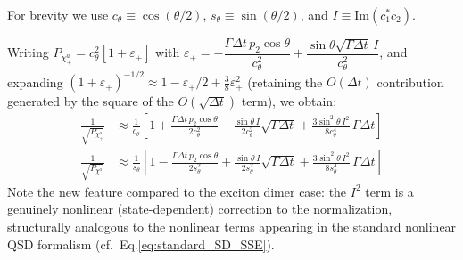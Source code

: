 \documentclass[a4paper,12pt]{article}
\begin{document}
For brevity we use $c_{\theta}\equiv\cos(\theta/2)$, $s_{\theta}\equiv\sin(\theta/2)$, and $I \equiv \text{Im}(c_{1}^{*}c_{2})$.

Writing $P_{\chi_{+}^{a}} = c_{\theta}^{2}\left[1+\varepsilon_{+}\right]$ with 
$\varepsilon_{+} = -\dfrac{\Gamma\Delta t\, p_{2}\cos\theta}{c_{\theta}^{2}} 
+ \dfrac{\sin\theta\sqrt{\Gamma\Delta t}\,I}{c_{\theta}^{2}}$, and expanding 
$(1+\varepsilon_{+})^{-1/2} \approx 1-\varepsilon_{+}/2+\frac{3}{8}\varepsilon_{+}^{2}$ 
(retaining the $O(\Delta t)$ contribution generated by the square of the 
$O(\sqrt{\Delta t})$ term), we obtain:
\begin{align}
	\frac{1}{\sqrt{P_{\chi_{+}^{a}}}} &\approx \frac{1}{c_{\theta}} 
	\left[ 1 + \frac{\Gamma\Delta t\, p_{2}\cos\theta}{2c_{\theta}^{2}} 
	- \frac{\sin\theta\, I}{2c_{\theta}^{2}}\sqrt{\Gamma\Delta t} 
	+ \frac{3\sin^{2}\theta\, I^{2}}{8c_{\theta}^{4}}\,\Gamma\Delta t \right]
	\label{eq:expansion_Pchiplus} \\
	\frac{1}{\sqrt{P_{\chi_{-}^{a}}}} &\approx \frac{1}{s_{\theta}} 
	\left[ 1 - \frac{\Gamma\Delta t\, p_{2}\cos\theta}{2s_{\theta}^{2}} 
	+ \frac{\sin\theta\, I}{2s_{\theta}^{2}}\sqrt{\Gamma\Delta t} 
	+ \frac{3\sin^{2}\theta\, I^{2}}{8s_{\theta}^{4}}\,\Gamma\Delta t \right]
	\label{eq:expansion_Pchiminus}
\end{align}
Note the new feature compared to the exciton dimer case: the $I^{2}$ term is a genuinely nonlinear (state-dependent) correction to the normalization, structurally analogous to the nonlinear terms appearing in the standard nonlinear QSD formalism 
(cf.\ Eq.\ref{eq:standard_SD_SSE}).
\end{document}

